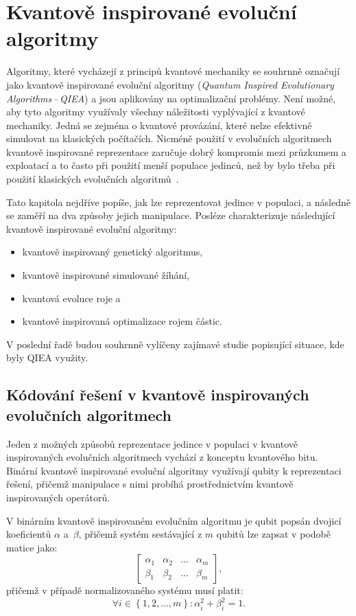 \chapter{Kvantově inspirované evoluční algoritmy} \label{chapt:qiea}
Algoritmy, které vycházejí z principů kvantové mechaniky se souhrnně označují jako kvantově inspirované evoluční algoritmy (\emph{Quantum Inspired Evolutionary Algorithms\,--\,QIEA}) a jsou aplikovány na optimalizační problémy. 
Není možné, aby tyto algoritmy využívaly všechny náležitosti vyplývající z kvantové mechaniky. 
Jedná se zejména o kvantové provázání, které nelze efektivně simulovat na klasických počítačích. 
Nicméně použití v evolučních algoritmech kvantově inspirované reprezentace zaručuje dobrý kompromis mezi průzkumem a exploatací a to často při použití menší populace jedinců, než by bylo třeba při použití klasických evolučních algoritmů~\cite{NaturalComputing}.

Tato kapitola nejdříve popíše, jak lze reprezentovat jedince v populaci, a následně se zaměří na dva způsoby jejich manipulace. 
Posléze charakterizuje následující kvantově inspirované evoluční algoritmy:
\begin{itemize}
    \item kvantově inspirovaný genetický algoritmus,
    \item kvantově inspirované simulované žíhání,
    \item kvantová evoluce roje a
    \item kvantově inspirovaná optimalizace rojem částic.
\end{itemize}
V poslední řadě budou souhrnně vylíčeny zajímavé studie popisující situace, kde byly QIEA využity. 

\section{Kódování řešení v kvantově inspirovaných evolučních algoritmech}
Jeden z možných způsobů reprezentace jedince v populaci v kvantově inspirovaných evolučních algoritmech vychází z konceptu kvantového bitu. 
Binární kvantově inspirované evoluční algoritmy využívají qubity k reprezentaci řešení, přičemž manipulace s nimi probíhá prostřednictvím kvantově inspirovaných operátorů.

V binárním kvantově inspirovaném evolučním algoritmu je qubit popsán dvojicí koeficientů $\alpha$ a~$\beta$, přičemž systém sestávající z $m$ qubitů lze zapsat v podobě matice jako: 
\begin{equation}\label{eq:quantum-representation}
    \begin{bmatrix}
        \alpha_1 & \alpha_2 & \dots & \alpha_m \\
        \beta_1  & \beta_2  & \dots & \beta_m
    \end{bmatrix},
\end{equation}
přičemž v případě normalizovaného systému musí platit:
\begin{equation}\label{eq:normalized-quantum-representation}
    \forall i \in \left\{1,2,\dots,m \right\}: \alpha^2_i + \beta^2_i = 1.
\end{equation}

